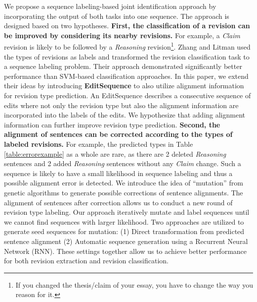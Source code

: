 \documentclass[11pt]{article}
\begin{document}
    We propose a sequence labeling-based joint identification approach by incorporating the output of both tasks into one sequence. The approach is designed based on two hypotheses. \textbf{First, the classification of a revision can be improved by considering its nearby revisions.} For example, a \textit{Claim} revision is likely to be followed by a \textit{Reasoning} revision\footnote{If you changed the thesis/claim of your essay, you have to change the way you reason for it.}. Zhang and Litman  used the types of revisions as labels and transformed the revision classification task to a sequence labeling problem. Their approach demonstrated significantly better performance than SVM-based classification approaches. In this paper, we extend their ideas by introducing \textbf{EditSequence} to also utilize alignment information for revision type prediction. An EditSequence describes a consecutive sequence of edits where not only the revision type but also the alignment information are incorporated into the labels of the edits. We hypothesize that adding alignment information can further improve revision type prediction. \textbf{Second, the alignment of sentences can be corrected according to the types of labeled revisions.} For example, the predicted types in Table \ref{table:errorexample} as a whole are rare, as there are 2 deleted \textit{Reasoning} sentences and 2 added \textit{Reasoning} sentences without any \textit{Claim} change. Such a sequence is likely to have a small likelihood in sequence labeling and thus a possible alignment error is detected. We introduce the idea of ``mutation'' from genetic algorithms to generate possible corrections of sentence alignments. The alignment of sentences after correction allows us to conduct a new round of revision type labeling. Our approach iteratively mutate and label sequences until we cannot find sequences with larger likelihood. Two approaches are utilized to generate seed sequences for mutation: (1) Direct transformation from predicted sentence alignment \cite{zhang-litman:2014:W14-18} (2) Automatic sequence generation using a Recurrent Neural Network (RNN). These settings together allow us to achieve better performance for both revision extraction and revision classification.  
\end{document}
